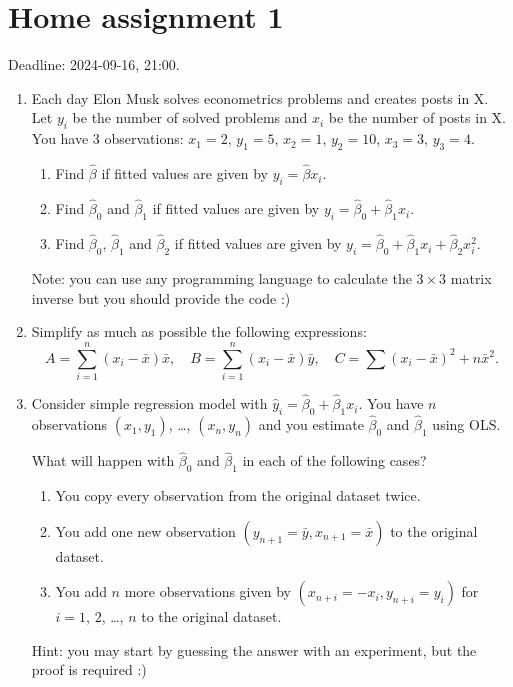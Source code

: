 \documentclass[12pt]{article}
\newcommand{\hb}{\hat\beta}
\begin{document}
\section*{Home assignment 1}

Deadline: 2024-09-16, 21:00.

\begin{enumerate}
\item Each day Elon Musk solves econometrics problems and creates posts in X.
Let $y_i$ be the number of solved problems and $x_i$ be the number of posts in X. 
You have 3 observations: $x_1 = 2$, $y_1 = 5$, $x_2 = 1$, $y_2 = 10$, $x_3 = 3$, $y_3 = 4$.

\begin{enumerate}
    \item Find $\hb$ if fitted values are given by $y_i = \hb x_i$.
    \item Find $\hb_0$ and $\hb_1$ if fitted values are given by $y_i = \hb_0 + \hb_1 x_i$.
    \item Find $\hb_0$, $\hb_1$ and $\hb_2$ if fitted values are given by $y_i = \hb_0 + \hb_1 x_i + \hb_2 x_i^2$.
\end{enumerate}

Note: you can use any programming language to calculate the $3\times 3$ matrix inverse but you should provide the code :)

\item Simplify as much as possible the following expressions:
\[
A = \sum_{i=1}^n (x_i - \bar x)\bar x, \quad B = \sum_{i=1}^n (x_i - \bar x)\bar y, \quad C = \sum (x_i - \bar x)^2 + n \bar x^2.
\]

\item  Consider simple regression model with $\hat y_i = \hb_0 + \hb_1 x_i$.
You have $n$ observations $(x_1, y_1)$, \dots, $(x_n, y_n)$ and you estimate $\hb_0$ and $\hb_1$ using OLS. 

What will happen with $\hb_0$ and $\hb_1$ in each of the following cases?

\begin{enumerate}
    \item You copy every observation from the original dataset twice.
    \item You add one new observation $(y_{n+1} = \bar y, x_{n+1} = \bar x)$ to the original dataset.
    \item You add $n$ more observations given by $(x_{n+i} = -x_i, y_{n+i} = y_i)$ for $i = 1$, $2$, \dots, $n$ to the original dataset.
\end{enumerate}

Hint: you may start by guessing the answer with an experiment, but the proof is required :)

\end{enumerate}
\end{document}

